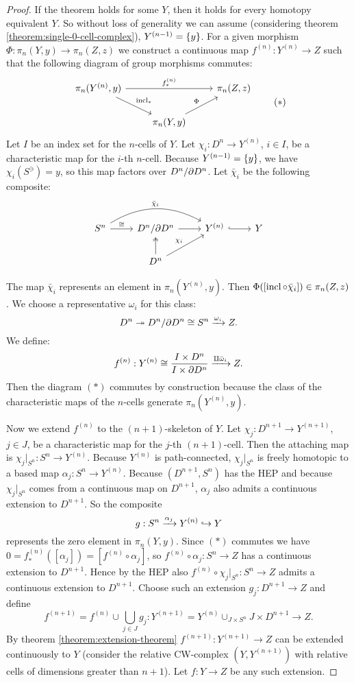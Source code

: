 \begin{proof}
If the theorem holds for some $Y$, then it holds for every homotopy equivalent $Y$. So without loss of generality we can assume (considering theorem \ref{theorem:single-0-cell-complex}), $Y^{({n-1})}=\{y\}$. For a given morphism $\Phi:\pi_n(Y,y)\to\pi_n(Z,z)$ we construct a continuous map $f^{(n)}:Y^{(n)}\to Z$ such that the following diagram of group morphisms commutes:
\[\begin{tikzcd}
\pi_n(Y^{(n)},y) \ar[dr,"\incl_*"] \ar[rr,"f^{(n)}_*"] & & \pi_n(Z,z) \\
& \pi_n(Y,y) \ar[ur,"\Phi"] &
\end{tikzcd}
\tag{$*$}\]
Let $I$ be an index set for the $n$-cells of $Y$. Let $\chi_i:D^n\to Y^{(n)}$, $i\in I$, be a characteristic map for the $i$-th $n$-cell. Because $Y^{({n-1})}=\{y\}$, we have $\chi_i(S^\ni)=y$, so this map factors over $D^n/\partial D^n$. Let $\bar\chi_i$ be the following composite:
\[\begin{tikzcd}
S^n \ar[r,"\cong"] \ar[rr,bend left,"\bar\chi_i"] & D^n/\de D^n \ar[r] & Y^{(n)} \ar[r,hook] & Y \\
& D^n \ar[u,two heads] \ar[ur,"\chi_i"] & & 
\end{tikzcd}\]

The map $\bar\chi_i$ represents an element in $\pi_n(Y^{(n)},y)$. Then $\Phi([\operatorname{incl}\circ\bar\chi_i])\in\pi_n(Z,z)$. We choose a representative $\omega_i$ for this class:
\[D^n\twoheadrightarrow D^n/\partial D^n\cong S^n\xrightarrow{\omega_i}Z.\]
We define:
\[f^{(n)}:Y^{(n)}\cong\frac{I\times D^n}{I\times\partial D^n}\xrightarrow{\amalg\bar\omega_i}Z.\]
Then the diagram $(*)$ commutes by construction because the class of the characteristic maps of the $n$-cells generate $\pi_n(Y^{(n)},y)$.

Now we extend $f^{(n)}$ to the $(n+1)$-skeleton of $Y$. Let $\chi_j:D^{n+1}\to Y^{(n+1)}$, $j\in J$, be a characteristic map for the $j$-th $(n+1)$-cell. Then the attaching map is $\chi_j|_{S^n}:S^n\to Y^{(n)}$. Because $Y^{(n)}$ is path-connected, $\chi_j|_{S^n}$ is freely homotopic to a based map $\alpha_j:S^n\to Y^{(n)}$. Because $(D^{n+1},S^n)$ has the HEP and because $\chi_j|_{S^n}$ comes from a continuous map on $D^{n+1}$, $\alpha_j$ also admits a continuous extension to $D^{n+1}$. So the composite
\[g:S^n\xrightarrow{\alpha_j}Y^{(n)}\hookrightarrow Y\]
represents the zero element in $\pi_n(Y,y)$. Since $(*)$ commutes we have $0=f^{(n)}_*([\alpha_j])=[f^{(n)}\circ\alpha_j]$, so $f^{(n)}\circ\alpha_j:S^n\to Z$ has a continuous extension to $D^{n+1}$. Hence by the HEP also $f^{(n)}\circ\chi_j|_{S^n}:S^n\to Z$ admits a continuous extension to $D^{n+1}$. Choose such an extension $g_j:D^{n+1}\to Z$ and define
\[f^{(n+1)}=f^{(n)}\cup\bigcup_{j\in J}g_j:Y^{(n+1)}=Y^{(n)}\cup_{J\times S^n}J\times D^{n+1}\to Z.\]
By theorem \ref{theorem:extension-theorem} $f^{(n+1)}:Y^{(n+1)}\to Z$ can be extended continuously to $Y$ (consider the relative CW-complex $(Y,Y^{(n+1)})$ with relative cells of dimensions greater than $n+1$). Let $f:Y\to Z$ be any such extension.


\end{proof}
